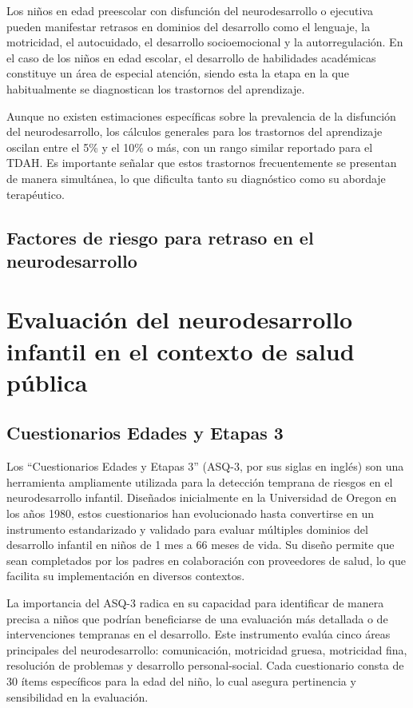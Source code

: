 \documentclass[11pt,letterpaper]{report}
\begin{document}
Los niños en edad preescolar con disfunción del neurodesarrollo o ejecutiva 
pueden manifestar retrasos en dominios del desarrollo como el lenguaje, la 
motricidad, el autocuidado, el desarrollo socioemocional y la autorregulación. 
En el caso de los niños en edad escolar, el desarrollo de habilidades
académicas constituye un área de especial atención, siendo esta la etapa en la
que  habitualmente se diagnostican los trastornos del aprendizaje.
\cite{Nelson49}

Aunque no existen estimaciones específicas sobre la prevalencia de la
disfunción del neurodesarrollo, los cálculos generales para los trastornos del
aprendizaje oscilan entre el 5\% y el 10\% o más, con un rango similar
reportado para el TDAH. Es importante señalar que estos trastornos
frecuentemente se presentan de manera simultánea, lo que dificulta tanto su
diagnóstico como su abordaje terapéutico.

\subsection{Factores de riesgo para retraso en el neurodesarrollo}


\section{Evaluación del neurodesarrollo infantil en el contexto de salud pública}

\subsection{Cuestionarios Edades y Etapas 3}
Los ``Cuestionarios Edades y Etapas 3'' (ASQ-3, por sus siglas en inglés) son
una herramienta ampliamente utilizada para la detección temprana de riesgos en
el neurodesarrollo infantil. Diseñados inicialmente en la Universidad de Oregon
en los años 1980, estos cuestionarios han evolucionado hasta convertirse en un
instrumento estandarizado y validado para evaluar múltiples dominios del
desarrollo infantil en niños de 1 mes a 66 meses de vida. Su diseño permite que
sean completados por los padres en colaboración con proveedores de salud, lo
que facilita su implementación en diversos contextos.
\cite{Singh2017, ASQ4decades}

La importancia del ASQ-3 radica en su capacidad para identificar de manera
precisa a niños que podrían beneficiarse de una evaluación más detallada o de
intervenciones tempranas en el desarrollo. Este instrumento evalúa cinco áreas
principales del neurodesarrollo: comunicación, motricidad gruesa, motricidad
fina, resolución de problemas y desarrollo personal-social. Cada cuestionario
consta de 30 ítems específicos para la edad del niño, lo cual asegura
pertinencia y sensibilidad en la evaluación. \cite{squires2009ages}
\end{document}
